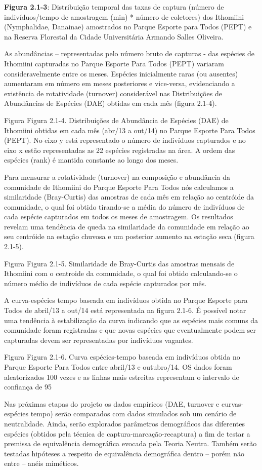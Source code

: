 \textbf{Figura 2.1-3}: Distribuição temporal das taxas de captura (número de indivíduos/tempo de amostragem (min) * número de coletores) dos Ithomiini (Nymphalidae, Danainae) amostrados no Parque Esporte para Todos (PEPT) e na Reserva Florestal da Cidade Universitária Armando Salles Oliveira.

As abundâncias – representadas pelo número bruto de capturas - das espécies de Ithomiini capturadas no Parque Esporte Para Todos (PEPT) variaram consideravelmente entre os meses. Espécies inicialmente raras (ou ausentes) aumentaram em número em meses posteriores e vice-versa, evidenciando a existência de rotatividade (turnover) considerável nas Distribuições de Abundâncias de Espécies (DAE) obtidas em cada mês (figura 2.1-4).  

Figura
Figura 2.1-4. Distribuições de Abundância de Espécies (DAE) de Ithomiini obtidas em cada mês (abr/13 a out/14) no Parque Esporte Para Todos (PEPT). No eixo y está representado o número de indivíduos capturados e no eixo x estão representadas as 22 espécies registradas na área. A ordem das espécies (rank) é mantida constante ao longo dos meses.

Para mensurar a rotatividade (turnover) na composição e abundância da comunidade de Ithomiini do Parque Esporte Para Todos nós calculamos a similaridade (Bray-Curtis) das amostras de cada mês em relação ao centróide da comunidade, o qual foi obtido tirando-se a média do número de indivíduos de cada espécie capturados em todos os meses de amostragem. Os resultados revelam uma tendência de queda na similaridade da comunidade em relação ao seu centróide na estação chuvosa e um posterior aumento na estação seca (figura 2.1-5).

Figura
Figura 2.1-5. Similaridade de Bray-Curtis das amostras mensais de Ithomiini com o centroide da comunidade, o qual foi obtido calculando-se o número médio de indivíduos de cada espécie capturados por mês.

A curva-espécies tempo baseada em indivíduos obtida no Parque Esporte para Todos de abril/13 a out/14 está representada na figura 2.1-6. É possível notar uma tendência à estabilização da curva indicando que as espécies mais comuns da comunidade foram registradas e que novas espécies que eventualmente podem ser capturadas devem ser representadas por indivíduos vagantes.

Figura
Figura 2.1-6. Curva espécies-tempo baseada em indivíduos obtida no Parque Esporte Para Todos entre abril/13 e outubro/14. OS dados foram aleatorizados 100 vezes e as linhas mais estreitas representam o intervalo de confiança de 95%

Nas próximas etapas do projeto os dados empíricos (DAE, turnover e curvas-espécies tempo) serão comparados com dados simulados sob um cenário de neutralidade. Ainda, serão explorados parâmetros demográficos das diferentes espécies (obtidos pela técnica de captura-marcação-recaptura) a fim de testar a premissa de equivalência demográfica evocada pela Teoria Neutra. Também serão testadas hipóteses a respeito de equivalência demográfica dentro – porém não entre – anéis miméticos.